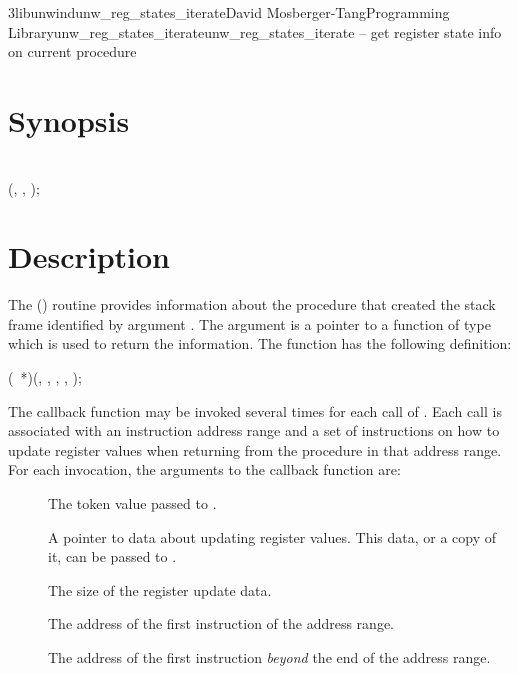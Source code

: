 \documentclass{article}
\begin{document}
\begin{Name}{3libunwind}{unw\_reg\_states\_iterate}{David Mosberger-Tang}{Programming Library}{unw\_reg\_states\_iterate}unw\_reg\_states\_iterate -- get register state info on current procedure
\end{Name}

\section{Synopsis}

\\

 (, , );\\

\section{Description}

The () routine provides
information about the procedure that created the stack frame
identified by argument .  The  argument is a pointer
to a function of type  which is used to
return the information.  The function  has the
following definition:

 (~*)(,
			,
			 ,
			 ,  );

The callback function may be invoked several times for each call of . Each call is associated with an instruction address range and a set of instructions on how to update register values when returning from the procedure in that address range.  For each invocation, the arguments to the callback function are:
\begin{description}
\item[ ] The token value passed to . \\
\item[ ] A pointer to data about
  updating register values. This data, or a copy of it, can be passed
  to .\\
\item[ ] The size of the register update data. \\
\item[ ] The address of the first
  instruction of the address range.  \\
\item[ ] The address of the first
  instruction \emph{beyond} the end of the address range.  \\
\end{description}
\end{document}
